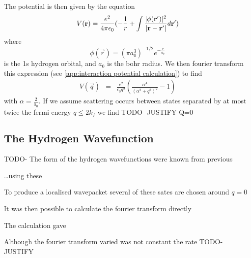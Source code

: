 The potential is then given by the equation
\begin{equation}
    V(\mathbf{r}) = \frac{e^2}{4 \pi \epsilon_0}(
    -\frac{1}{r}
    + \int{\frac{\lvert\phi(\mathbf{r}')\rvert^2}{
            \lvert\mathbf{r} - \mathbf{r'}\rvert} d\mathbf{r}'})
\end{equation}
where
\begin{equation}
    \phi(\vec{r}) = {(\pi a_0^3)}^{-1/2} e^{-\frac{r}{a_0}}
\end{equation}
is the 1s hydrogen orbital, and \(a_0\) is
the bohr radius. We then fourier
transform this expression
(see \cref{app:interaction potential calculation})
to find
\begin{eqnarray}
    V(\vec{q}) &=& \frac{e^2}{\epsilon_0 q^2}(
    \frac{\alpha^4}{{(\alpha^2 + q^2)}^2} - 1
    )
\end{eqnarray}
with \(\alpha = \frac{2}{a_0}\). If we assume scattering
occurs between states separated by at most
twice the fermi energy \(q \leq 2k_f\) we find
TODO- JUSTIFY Q=0

\subsection{The Hydrogen Wavefunction}
TODO-
The form of the hydrogen wavefunctions were
known from previous

\ldots using these

To produce a localised wavepacket several of these
sates are chosen around \(q=0\)

It was then possible to calculate the fourier
transform directly

The calculation gave

Although the fourier transform varied was not constant
the rate
TODO-JUSTIFY